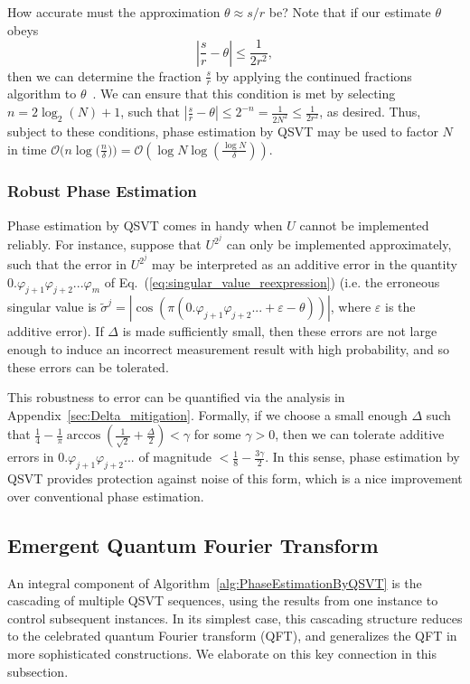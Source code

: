 \documentclass[aps,pra,showpacs,notitlepage,twocolumn,superscriptaddress,nofootinbib]{revtex4-1}
\begin{document}
    How accurate must the approximation $\theta \approx s/r$ be? Note that if our estimate $\theta$ obeys
    \begin{equation}
        \left| \frac{s}{r} - \theta \right| \leq \frac{1}{2r^2},
    \end{equation}
    then we can determine the fraction $\frac{s}{r}$ by applying the continued fractions algorithm to $\theta$~\cite{nielsen2010quantum}. We can ensure that this condition is met by selecting $n = 2\log_2(N) + 1$, such that $\left| \frac{s}{r} - \theta \right| \leq 2^{-n} = \frac{1}{2N^2} \leq \frac{1}{2r^2}$, as desired. Thus, subject to these conditions, phase estimation by QSVT may be used to factor $N$ in time $ \mathcal{O}\big(n \log \big( \frac{n}{\delta} \big) \big) = \mathcal{O}\left(\log N \log \left( \frac{\log N}{\delta} \right) \right)$. 
        
    \subsubsection{Robust Phase Estimation}\label{sec:PhaseEstimation_Robust}
    Phase estimation by QSVT comes in handy when $U$ cannot be implemented reliably. For instance, suppose that $U^{2^j}$ can only be implemented approximately, such that the error in $U^{2^j}$ may be interpreted as an additive error in the quantity $0.\varphi_{j+1}\varphi_{j+2} ... \varphi_m$ of Eq.~(\ref{eq:singular_value_reexpression}) (i.e. the erroneous singular value is $\tilde{\sigma}^j = |\cos(\pi(0.\varphi_{j+1} \varphi_{j+2} ... + \varepsilon - \theta))|$, where $\varepsilon$ is the additive error). If $\Delta$ is made sufficiently small, then these errors are not large enough to induce an incorrect measurement result with high probability, and so these errors can be tolerated. 
    
    This robustness to error can be quantified via the analysis in Appendix~\ref{sec:Delta_mitigation}. Formally, if we choose a small enough $\Delta$ such that $\frac{1}{4} - \frac{1}{\pi} \arccos(\frac{1}{\sqrt{2}} +\frac{\Delta}{2}) < \gamma$ for some $\gamma > 0$, then we can tolerate additive errors in $0.\varphi_{j+1}\varphi_{j+2} ...$ of magnitude $< \frac{1}{8} - \frac{3\gamma}{2}$. In this sense, phase estimation by QSVT provides protection against noise of this form, which is a nice improvement over conventional phase estimation.



    \subsection{Emergent Quantum Fourier Transform}\label{sec:EmergentQFT}
    An integral component of Algorithm~\ref{alg:PhaseEstimationByQSVT} is the cascading of multiple QSVT sequences, using the results from one instance to control subsequent instances. In its simplest case, this cascading structure reduces to the celebrated quantum Fourier transform (QFT), and generalizes the QFT in more sophisticated constructions. We elaborate on this key connection in this subsection.
    
\end{document}

